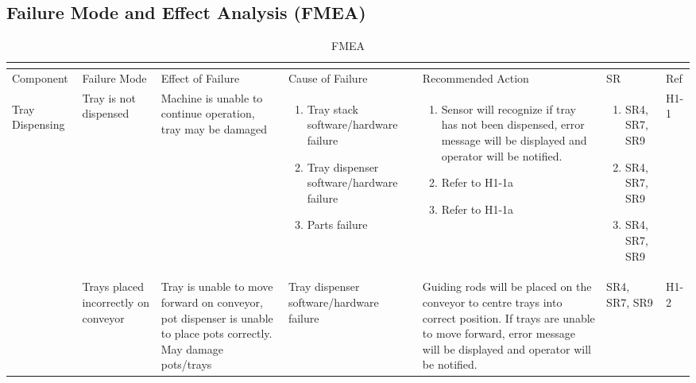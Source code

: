 \documentclass{article}
\begin{document}
\newpage
\begin{landscape}
\section{Failure Mode and Effect Analysis (FMEA)}

\begin{center}
    
    \begin{longtable}{|l|  p{3cm}  p{4cm}  p{3cm}  p{4cm}  p{2cm}  p{1cm}|}
        \caption{FMEA}\\
        \label{tab:Table1}\\
        \hline
        Component&
        Failure Mode&
        Effect of Failure&
        Cause of Failure &
        Recommended Action &
        SR&
        Ref \\
        \hline
        \begin{centering}
        Tray Dispensing
        \end{centering} &
        Tray is not dispensed & 
        Machine is unable to continue operation, tray may be damaged & 
        \begin{enumerate}[label=(\alph*)]
            \item Tray stack software/hardware failure
            \item Tray dispenser software/hardware failure 
            \item Parts failure 
        \end{enumerate} &
        \begin{enumerate}[label=(\alph*)]
            \item  Sensor will recognize if tray has not been dispensed, error message will be displayed and operator will be notified.
            \item  Refer to H1-1a
            \item Refer to H1-1a
        \end{enumerate}&
        \begin{enumerate}[label=(\alph*)]
            \item SR4, SR7, SR9
            \item SR4, SR7, SR9
            \item SR4, SR7, SR9
        \end{enumerate}&
        H1-1\\
 
         &
        Trays placed incorrectly on conveyor&
        Tray is unable to move forward on conveyor, pot dispenser is unable to place pots correctly. May damage pots/trays&
        Tray dispenser software/hardware failure&
        Guiding rods will be placed on the conveyor to centre trays into correct position. If trays are unable to move forward, error message will be displayed and operator will be notified.&
        SR4, SR7, SR9&
        H1-2\\


\end{longtable}
\end{center}
\end{landscape}
\end{document}

